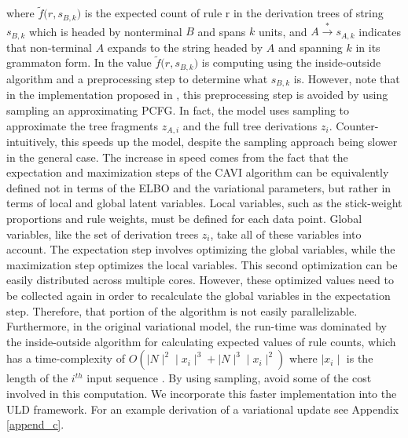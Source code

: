 \documentclass[12pt,letterpaper]{article}
\begin{document}
where $\tilde f \Big(r, s_{B,k}\Big)$ is the expected count of rule r in the derivation trees of string $s_{B,k}$ which is headed by nonterminal $B$ and spans $k$ units, and $A \overset{*}{\rightarrow} s_{A,k}$ indicates that non-terminal $A$ expands to the string headed by $A$ and spanning $k$ in its grammaton form. In \citet{cohen:2010} the value $\tilde f \Big(r, s_{B,k}\Big)$ is computing using the inside-outside algorithm and a preprocessing step to determine what $s_{B,k}$ is. However, note that in the implementation proposed in \citet{zhai:2014}, this preprocessing step is avoided by using sampling an approximating PCFG. In fact, the \citet{zhai:2014} model uses sampling to approximate the tree fragments $z_{A,i}$ and the full tree derivations $z_i$. Counter-intuitively, this speeds up the model, despite the sampling approach being slower in the general case. The increase in speed comes from the fact that the expectation and maximization steps of the CAVI algorithm can be equivalently defined not in terms of the ELBO and the variational parameters, but rather in terms of local and global latent variables. Local variables, such as the stick-weight proportions and rule weights, must be defined for each data point. Global variables, like the set of derivation trees $z_i$, take all of these variables into account. The expectation step involves optimizing the global variables, while the maximization step optimizes the local variables. This second optimization can be easily distributed across multiple cores. However, these optimized values need to be collected again in order to recalculate the global variables in the expectation step. Therefore, that portion of the algorithm is not easily parallelizable. Furthermore, in the original variational model, the run-time was dominated by the inside-outside algorithm for calculating expected values of rule counts, which has a time-complexity of $O(\mid N \mid^2 \mid x_i \mid^3 + \mid N \mid^3\mid x_i\mid^2)$ where $\mid x_i \mid$ is the length of the $i^{th}$ input sequence \citep{cohen:2010}. By using sampling, \citet{zhai:2014} avoid some of the cost involved in this computation. We incorporate this faster implementation into the ULD framework. For an example derivation of a variational update see Appendix \ref{append_c}. 
\end{document}
